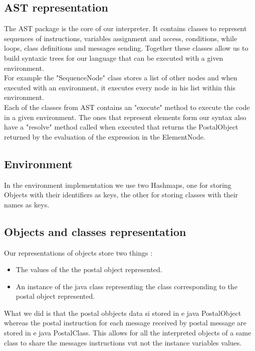 \documentclass{eplDoc}
\begin{document}
\subsection{AST representation}
The AST package is the core of our interpreter. It contains classes to represent sequences of instructions, variables assignment and access, conditions, while loops, class definitions and messages sending. Together these classes allow us to build syntaxic trees for our language that can be executed with a given environment. \\ 
For example the "SequenceNode" class stores a list of other nodes and when executed with an environment, it executes every node in his list within this environment. \\ 
Each of the classes from AST contains an "execute" method to execute the code in a given environment. The ones that represent elements form our syntax also have a "resolve" method called when executed that returns the PostalObject returned by the evaluation of the expression in the ElementNode. 

\subsection{Environment}

In the environment implementation we use two Hashmaps, one for storing Objects with their identifiers as keys, the other for storing classes with their names as keys. \\ 


\subsection{Objects and classes representation}

Our representations of objects store two things : 
\begin{itemize}
	\item The values of the the postal object represented.
	\item An instance of the java class representing the class corresponding to the postal object represented.
\end{itemize}
What we did is that the postal obbjects data si stored in e java PostalObject whereas the postal instruction for each message received by postal message are stored in e java PostalClass. This allows for all the interpreted objects of a same class to share the messages instructions vut not the instance variables values. 
\end{document}
